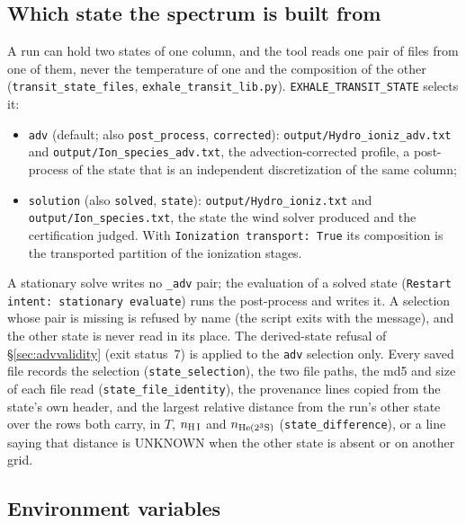 \documentclass[english,a4paper]{my_memo}
\begin{document}
\subsection{Which state the spectrum is built from}\label{sec:stateselect}

A run can hold two states of one column, and the tool reads one pair of files
from one of them, never the temperature of one and the composition of the
other (\texttt{transit\_state\_files}, \texttt{exhale\_transit\_lib.py}).
\texttt{EXHALE\_TRANSIT\_STATE} selects it:
\begin{sloppypar}
\begin{itemize}
  \item \texttt{adv} (default; also \texttt{post\_process},
    \texttt{corrected}): \texttt{output/Hydro\_ioniz\_adv.txt} and
    \texttt{output/Ion\_species\_adv.txt}, the advection-corrected profile,
    a post-process of the state that is an independent discretization of the
    same column;
  \item \texttt{solution} (also \texttt{solved}, \texttt{state}):
    \texttt{output/Hydro\_ioniz.txt} and \texttt{output/Ion\_species.txt},
    the state the wind solver produced and the certification judged. With
    \texttt{Ionization transport: True} its composition is the transported
    partition of the ionization stages.
\end{itemize}
\end{sloppypar}
A stationary solve writes no \texttt{\_adv} pair; the evaluation of a
solved state (\texttt{Restart intent: stationary evaluate}) runs the
post-process and writes it. A selection whose pair is missing is refused by
name (the script exits with the message), and the other state is never read
in its place. The derived-state refusal of \S\ref{sec:advvalidity} (exit
status~7) is applied to the \texttt{adv} selection only. Every saved file
records the selection (\texttt{state\_selection}), the two file paths, the
md5 and size of each file read (\texttt{state\_file\_identity}), the
provenance lines copied from the state's own header, and the largest relative
distance from the run's other state over the rows both carry, in $T$,
$n_{\rm H\,I}$ and $n_{\rm He(2^3S)}$ (\texttt{state\_difference}), or a
line saying that distance is UNKNOWN when the other state is absent or on
another grid.

\subsection{Environment variables}\label{sec:envvars}
\end{document}
